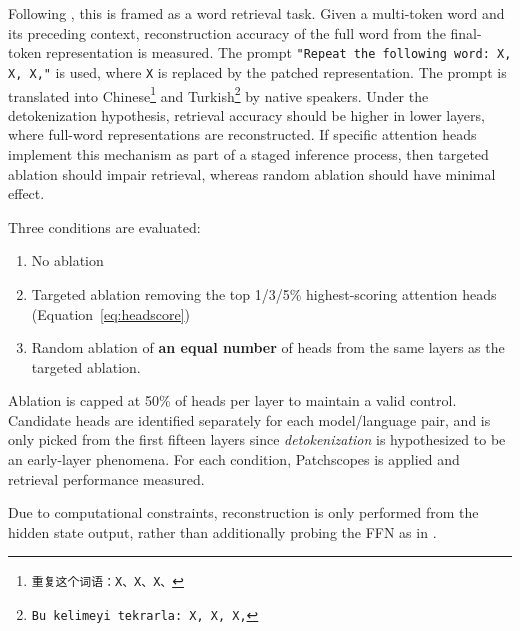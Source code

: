 Following \citet{kaplan2025}, this is framed as a word retrieval task. Given a multi-token word and its preceding context, reconstruction accuracy of the full word from the final-token representation is measured. The prompt \texttt{"Repeat the following word: X, X, X,"} is used, where \texttt{X} is replaced by the patched representation. The prompt is translated into Chinese\footnote{\texttt{重复这个词语：X、X、X、}} and Turkish\footnote{\texttt{Bu kelimeyi tekrarla: X, X, X,}} by native speakers. Under the detokenization hypothesis, retrieval accuracy should be higher in lower layers, where full-word representations are reconstructed. If specific attention heads implement this mechanism as part of a staged inference process, then targeted ablation should impair retrieval, whereas random ablation should have minimal effect.

Three conditions are evaluated:

\begin{enumerate}
\tightlist
\item No ablation
\item Targeted ablation removing the top 1/3/5\% highest-scoring attention heads (Equation~\ref{eq:headscore})
\item Random ablation of \textbf{an equal number} of heads from the same layers as the targeted ablation.
\end{enumerate}

Ablation is capped at 50\% of heads per layer to maintain a valid control. Candidate heads are identified separately for each model/language pair, and is only picked from the first fifteen layers since \textit{detokenization} is hypothesized to be an early-layer phenomena. For each condition, Patchscopes is applied and retrieval performance measured.

Due to computational constraints, reconstruction is only performed from the hidden state output, rather than additionally probing the FFN as in \citet{kaplan2025}.
